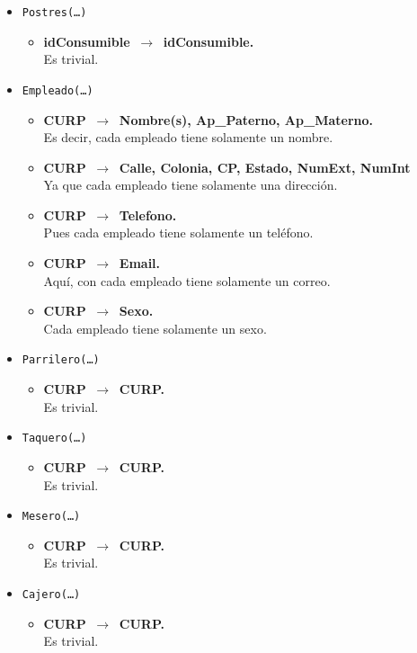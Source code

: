 \documentclass{article}
\newcommand{\flecha}{$\,\to\,$ }
\begin{document}
\begin{itemize}
\item \texttt{Postres(\ldots)}
	\begin{itemize}
		\item \textbf{idConsumible \flecha idConsumible.}\\
		Es trivial.
	\end{itemize}

\item \texttt{Empleado(\ldots)}
	\begin{itemize}
		\item \textbf{CURP \flecha Nombre(s), Ap\_Paterno, Ap\_Materno.}\\
		 Es decir, cada empleado tiene solamente un nombre.		
		\item \textbf{CURP \flecha Calle, Colonia, CP, Estado, NumExt, NumInt}\\
		Ya que cada empleado tiene solamente una dirección.
		\item \textbf{CURP \flecha Telefono.}\\
		Pues cada empleado tiene solamente un teléfono.
		\item \textbf{CURP \flecha Email.}\\
		Aquí, con cada empleado tiene solamente un correo.
		\item \textbf{CURP \flecha Sexo.}\\
		Cada empleado tiene solamente un sexo.
	\end{itemize}

\item \texttt{Parrilero(\ldots)}
	\begin{itemize}
		\item \textbf{CURP \flecha CURP.}\\
		Es trivial.
	\end{itemize}

\item \texttt{Taquero(\ldots)}
	\begin{itemize}
		\item \textbf{CURP \flecha CURP.}\\
		Es trivial.
	\end{itemize}

\item \texttt{Mesero(\ldots)}
	\begin{itemize}
		\item \textbf{CURP \flecha CURP.}\\
		Es trivial.
	\end{itemize}

\item \texttt{Cajero(\ldots)}
	\begin{itemize}
		\item \textbf{CURP \flecha CURP.}\\
		Es trivial.
	\end{itemize}


\end{itemize}
\end{document}
